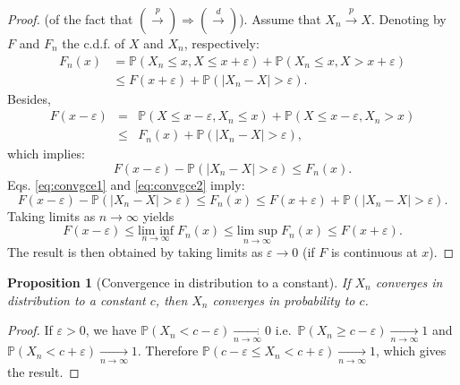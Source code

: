 \documentclass[
  11pt,
]{book}
\newtheorem{proposition}{Proposition}[chapter]
\theoremstyle{definition}
\theoremstyle{definition}
\theoremstyle{definition}
\theoremstyle{definition}
\theoremstyle{remark}
\begin{document}
\begin{proof}
(of the fact that \(\left(\overset{p}{\rightarrow}\right) \Rightarrow \left( \overset{d}{\rightarrow}\right)\)). Assume that \(X_n \overset{p}{\rightarrow} X\). Denoting by \(F\) and \(F_n\) the c.d.f. of \(X\) and \(X_n\), respectively:
\begin{equation}
\begin{aligned}
F_n(x) &= \mathbb{P}(X_n \le x,X\le x+\varepsilon) + \mathbb{P}(X_n \le x,X > x+\varepsilon)\\
&\le F(x+\varepsilon) + \mathbb{P}(|X_n - X|>\varepsilon).
\end{aligned}
\label{eq:convgce1}
\end{equation}
Besides,
\begin{eqnarray*}
F(x-\varepsilon) &=& \mathbb{P}(X \le x-\varepsilon,X_n \le x) + \mathbb{P}(X \le x-\varepsilon,X_n > x)\\
&\le& F_n(x) + \mathbb{P}(|X_n - X|>\varepsilon),
\end{eqnarray*}
which implies:
\begin{equation}
F(x-\varepsilon) - \mathbb{P}(|X_n - X|>\varepsilon) \le F_n(x).\label{eq:convgce2}
\end{equation}
Eqs. \eqref{eq:convgce1} and \eqref{eq:convgce2} imply:
\[
F(x-\varepsilon) - \mathbb{P}(|X_n - X|>\varepsilon) \le F_n(x)  \le F(x+\varepsilon) + \mathbb{P}(|X_n - X|>\varepsilon).
\]
Taking limits as \(n \rightarrow \infty\) yields
\[
F(x-\varepsilon) \le \underset{n \rightarrow \infty}{\mbox{lim inf}}\; F_n(x) \le \underset{n \rightarrow \infty}{\mbox{lim sup}}\; F_n(x)  \le F(x+\varepsilon).
\]
The result is then obtained by taking limits as \(\varepsilon \rightarrow 0\) (if \(F\) is continuous at \(x\)).
\end{proof}

\begin{proposition}[Convergence in distribution to a constant]
\protect\hypertarget{prp:cvgce11}{}\label{prp:cvgce11}If \(X_n\) converges in distribution to a constant \(c\), then \(X_n\) converges in probability to \(c\).
\end{proposition}

\begin{proof}
If \(\varepsilon>0\), we have \(\mathbb{P}(X_n < c - \varepsilon) \underset{n \rightarrow \infty}{\rightarrow} 0\) i.e.~\(\mathbb{P}(X_n \ge c - \varepsilon) \underset{n \rightarrow \infty}{\rightarrow} 1\) and \(\mathbb{P}(X_n < c + \varepsilon) \underset{n \rightarrow \infty}{\rightarrow} 1\). Therefore \(\mathbb{P}(c - \varepsilon \le X_n < c + \varepsilon) \underset{n \rightarrow \infty}{\rightarrow} 1\),
which gives the result.
\end{proof}
\end{document}
